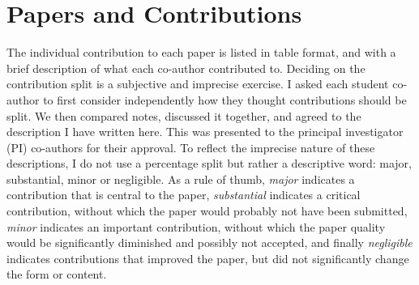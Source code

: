 \section{Papers and Contributions}
The individual contribution to each paper is listed in table format, and with a brief description of what each co-author contributed to. Deciding on the contribution split is a subjective and imprecise exercise. I asked each student co-author to first consider independently how they thought contributions should be split. We then compared notes, discussed it together, and agreed to the description I have written here. This was presented to the principal investigator (PI) co-authors for their approval. To reflect the imprecise nature of these descriptions, I do not use a percentage split but rather a descriptive word: major, substantial, minor or negligible. As a rule of thumb, \emph{major} indicates a contribution that is central to the paper, \emph{substantial} indicates a critical contribution, without which the paper would probably not have been submitted, \emph{minor} indicates an important contribution, without which the paper quality would be significantly diminished and possibly not accepted, and finally \emph{negligible} indicates contributions that improved the paper, but did not significantly change the form or content.

